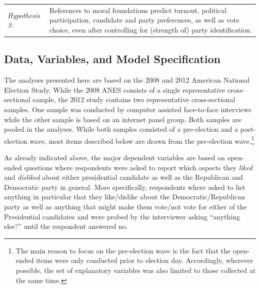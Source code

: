 \documentclass[12pt]{paper}
\begin{document}
\vspace{0.3cm}
\begin{tabular}{lp{12cm}}
\textsl{Hypothesis 3:} & References to moral foundations predict turnout, political participation, candidate and party preferences, as well as vote choice, even after controlling for (strength of) party identification.
\end{tabular}
\vspace{0.5cm}




\subsection{Data, Variables, and Model Specification}

The analyses presented here are based on the 2008 and 2012 American National Election Study. While the 2008 ANES consists of a single representative cross-sectional sample, the 2012 study contains two representative cross-sectional samples. One sample was conducted by computer assisted face-to-face interviews while the other sample is based on an internet panel group. Both samples are pooled in the analyses. While both samples consisted of a pre-election and a post-election wave, most items described below are drawn from the pre-election wave.\footnote{The main reason to focus on the pre-election wave is the fact that the open-ended items were only conducted prior to election day. Accordingly, wherever possible, the set of explanatory variables was also limited to those collected at the same time.}

As already indicated above, the major dependent variables are based on open-ended questions where respondents were asked to report which aspects they \textit{liked} and \textit{disliked} about either presidential candidate as well as the Republican and Democratic party in general. More specifically, respondents where asked to list anything in particular that they like/dislike about the Democratic/Republican party as well as anything that might make them vote/not vote for either of the Presidential candidates and were probed by the interviewer asking ``anything else?'' until the respondent answered no.
\end{document}
